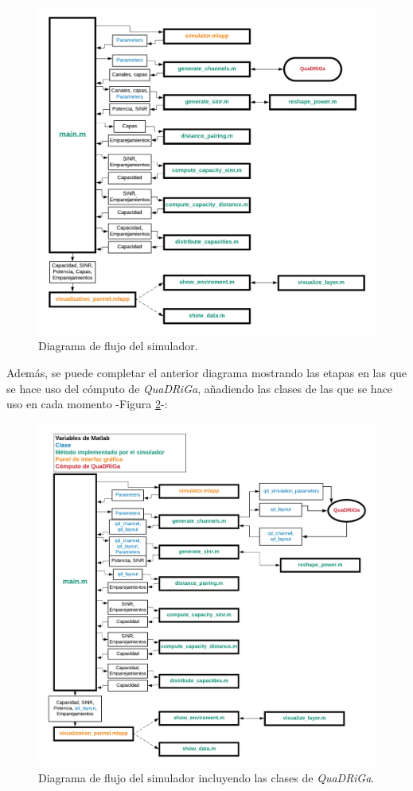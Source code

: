 \begin{figure}[h!]
	\centering
    \includegraphics[width=\linewidth]{imagenes/diagrama_simulador.png}
	\caption{Diagrama de flujo del simulador.}
	\label{fig:diagrama_simulador}
\end{figure}

Además, se puede completar el anterior diagrama mostrando las etapas en las que se hace uso del cómputo de \textit{QuaDRiGa}, añadiendo las clases de las que se hace uso en cada momento -Figura \ref{fig:diagrama_simulador_completo}-:

\begin{figure}[h!]
	\centering
    \includegraphics[width=\linewidth]{imagenes/diagrama_simulador_completo.png}
	\caption{Diagrama de flujo del simulador incluyendo las clases de \textit{QuaDRiGa}.}
	\label{fig:diagrama_simulador_completo}
\end{figure}

